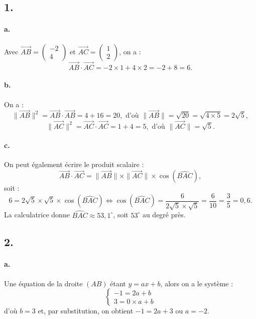 \subsection*{1.}

\paragraph{a.} Avec \(\overrightarrow{AB} = \begin{pmatrix} -2 \\ 4 \end{pmatrix}\) et \(\overrightarrow{AC} = \begin{pmatrix} 1 \\ 2 \end{pmatrix}\), on a :
\[
\overrightarrow{AB} \cdot \overrightarrow{AC} = -2 \times 1 + 4 \times 2 = -2 + 8 = 6.
\]

\paragraph{b.} On a :
\[
\|\overrightarrow{AB}\|^2 = \overrightarrow{AB} \cdot \overrightarrow{AB} = 4 + 16 = 20, \text{ d'où } \|\overrightarrow{AB}\| = \sqrt{20} = \sqrt{4 \times 5} = 2 \sqrt{5},
\]
\[
\|\overrightarrow{AC}\|^2 = \overrightarrow{AC} \cdot \overrightarrow{AC} = 1 + 4 = 5, \text{ d'où } \|\overrightarrow{AC}\| = \sqrt{5}.
\]

\paragraph{c.} On peut également écrire le produit scalaire :
\[
\overrightarrow{AB} \cdot \overrightarrow{AC} = \|\overrightarrow{AB}\| \times \|\overrightarrow{AC}\| \times \cos(\widehat{BAC}),
\]
soit :
\[
6 = 2 \sqrt{5} \times \sqrt{5} \times \cos(\widehat{BAC}) \iff \cos(\widehat{BAC}) = \dfrac{6}{2 \sqrt{5} \times \sqrt{5}} = \dfrac{6}{10} = \dfrac{3}{5} = 0{,}6.
\]
La calculatrice donne \(\widehat{BAC} \approx 53{,}1^\circ\), soit \(53^\circ\) au degré près.

\subsection*{2.}

\paragraph{a.} Une équation de la droite \((AB)\) étant \(y = ax + b\), alors on a le système :
\[
\begin{cases} 
-1 = 2a + b \\ 
3 = 0 \times a + b 
\end{cases}
\]
d'où \(b = 3\) et, par substitution, on obtient \(-1 = 2a + 3\) ou \(a = -2\).

